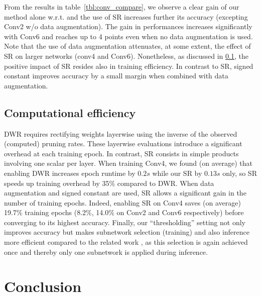   From the results in table~\ref{tbl:conv_compare}, we observe a clear gain of
  our method alone w.r.t.  \cite{DBLP:conf/nips/ZhouLLY19} and the use of SR
  increases further its accuracy (excepting Conv2 w/o data augmentation).  The
  gain in performances increases  significantly with Conv6 and reaches up to 4
  points even when no data augmentation is used.   Note that the use of data
  augmentation attenuates, at some extent, the effect of SR on larger networks
  (conv4 and Conv6). Nonetheless,  as discussed in \cref{sec:SR-impact}, the
  positive impact of SR resides also in training efficiency.   In contrast to
  SR, signed constant improves accuracy by a small margin when combined with
  data augmentation. 
  
  
  \subsection{Computational efficiency}
  \label{sec:SR-impact}
DWR requires rectifying weights layerwise using the inverse of the observed
(computed) pruning rates. These layerwise evaluations introduce a significant
overhead at each training epoch. In contrast, SR consists in simple products
involving one scalar per layer. When training Conv4, we found (on average) that
enabling DWR increases epoch runtime by $0.2s$ while our SR by $0.13s$ only, so
SR speeds up training overhead by 35\% compared to DWR.  When data augmentation
and signed constant are used, SR allows a significant gain in the number of
training epochs. Indeed, enabling SR on Conv4  saves (on average) 19.7\%
training epochs (8.2\%, 14.0\%  on Conv2 and Conv6 respectively) before
converging to its highest accuracy. Finally, our ``thresholding'' setting not
only improves accuracy but makes subnetwork selection (training) and also
inference more efficient compared to the related work
\cite{DBLP:conf/nips/ZhouLLY19,DBLP:conf/cvpr/RamanujanWKFR20},  as this
selection is again achieved  once and thereby only one subnetwork is applied
during inference.
 

\section{Conclusion}


